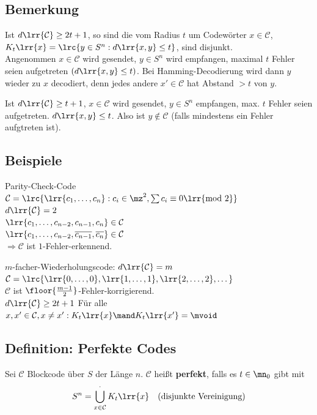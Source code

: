 	\subsection{Bemerkung}
			\item Ist $d\lrr{\mathcal{C}}\geq 2t+1$, so sind die  vom Radius $t$ um Codewörter $x\in\mathcal{C}$, $K_t\lrr{x}=\lrc{y\in S^n: d\lrr{x,y}\leq t}$, sind disjunkt.\\
				Angenommen $x\in\mathcal{C}$ wird gesendet, $y\in S^n$ wird empfangen, maximal $t$ Fehler seien aufgetreten $(d\lrr{x,y}\leq t)$. Bei Hamming-Decodierung wird dann $y$ wieder zu $x$ decodiert, denn jedes andere $x'\in\mathcal{C}$ hat Abstand $>t$ von $y$.
				
			\item Ist $d\lrr{\mathcal{C}}\geq t+1$, $x\in\mathcal{C}$ wird gesendet, $y\in S^n$ empfangen, max. $t$ Fehler seien aufgetreten. $d\lrr{x,y}\leq t$. Also ist $y\notin\mathcal{C}$ (falls mindestens ein Fehler aufgtreten ist).
		\subExEnd
		
	\subsection{Beispiele}
			\item Parity-Check-Code\\
				$\mathcal{C}=\lrc{\lrr{c_1,\dots,c_n}:c_i\in\mz^2,\sum c_i\equiv 0\lrr{\mbox{mod }2}}$\\
				$d\lrr{\mathcal{C}}=2$\\
				$\lrr{c_1,\dots,c_{n-2},c_{n-1},c_n}\in\mathcal{C}$\\
				$\lrr{c_1,\dots,c_{n-2},\overline{c_{n-1}},\overline{c_n}}\in\mathcal{C}$\\
				$\Rightarrow\mathcal{C}$ ist $1$-Fehler-erkennend.
			\item $m$-facher-Wiederholungscode: $d\lrr{\mathcal{C}}=m$\\
				$\mathcal{C}=\lrc{\lrr{0,\dots,0},\lrr{1,\dots,1},\lrr{2,\dots,2},\dots}$\\
				$\mathcal{C}$ ist $\floor{\frac{m-1}{2}}$-Fehler-korrigierend.\\
				$d\lrr{\mathcal{C}}\geq 2t+1$ Für alle $x,x'\in \mathcal{C}, x\neq x': K_t\lrr{x}\mand K_t\lrr{x'}=\mvoid$
		\subExEnd
		
	\subsection{Definition: Perfekte Codes}
		Sei $\mathcal{C}$ Blockcode über $S$ der Länge $n$.
		$\mathcal{C}$ heißt \textbf{perfekt}, falls es $t\in\mn_0$ gibt mit \[S^n=\bigcup_{x\in\mathcal{C}}^{\cdot}K_t\lrr{x}\quad\mbox{(disjunkte Vereinigung)}\]
	
